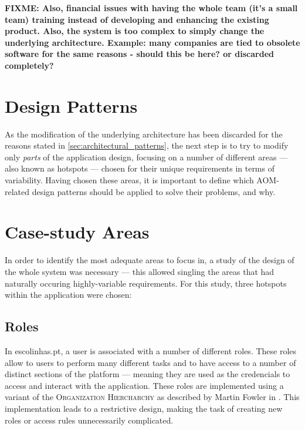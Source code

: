 \textbf{FIXME: Also, financial issues with having the whole team (it's a small team) training instead of developing and enhancing the existing product. Also, the system is too complex to simply change the underlying architecture. Example: many companies are tied to obsolete software for the same reasons - should this be here? or discarded completely?}

\section{Design Patterns}\label{sec:design_patterns}

As the modification of the underlying architecture has been discarded for the reasons stated in \ref{sec:architectural_patterns}, the next step is to try to modify only \emph{parts} of the application design, focusing on a number of different areas --- also known as hotspots --- chosen for their unique requirements in terms of variability. Having chosen these areas, it is important to define which AOM-related design patterns should be applied to solve their problems, and why.

\section{Case-study Areas}\label{sec:case-study_areas}

In order to identify the most adequate areas to focus in, a study of the design of the whole system was necessary --- this allowed singling the areas that had naturally occuring highly-variable requirements. For this study, three hotspots within the application were chosen:

\subsection{Roles}\label{sec:case-study_areas_roles}

In escolinhas.pt, a user is associated with a number of different roles. These roles allow to users to perform many different tasks and to have access to a number of distinct sections of the platform --- meaning they are used as the credencials to access and interact with the application. These roles are implemented using a variant of the \textsc{Organization Hiercharchy} as described by Martin Fowler in \cite{fowler_accountability}. This implementation leads to a restrictive design, making the task of creating new roles or access rules unnecessarily complicated.
  
